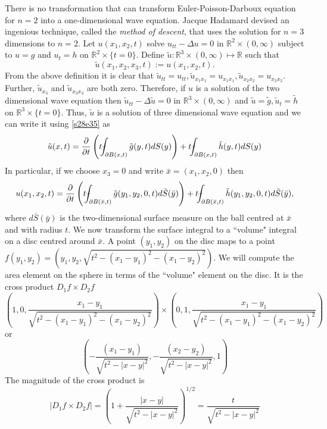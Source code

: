 \documentclass{article}
\newcommand{\fint}{\mbox{--}\mkern-16mu\int}
\theoremstyle{plain}
\numberwithin{thm}{section}
\theoremstyle{plain}
\numberwithin{prop}{section}
\theoremstyle{definition}
\numberwithin{defn}{section}
\theoremstyle{remark}
\numberwithin{equation}{section}
\begin{document}
There is no transformation that can transform Euler-Poisson-Darboux equation for $n=2$ into a one-dimensional wave 
equation. Jacque Hadamard devised an ingenious technique, called the \emph{method of descent}, that uses the 
solution for $n=3$ dimensions to $n=2$. Let $u(x_1, x_2, t)$ solve $u_{tt} - \Delta u = 0$ in $\mathbb{R}^2 \times 
(0, \infty)$ subject to $u = g$ and $u_t = h$ on $\mathbb{R}^2 \times \{t=0\}$. Define $\tilde{u}: \mathbb{R}^3 
\times (0, \infty) \mapsto \mathbb{R}$ such that
\begin{equation}\label{s28e38}
\tilde{u}(x_1, x_2, x_3, t) := u(x_1, x_2, t).
\end{equation}
From the above definition it is clear that $\tilde{u}_{tt} = u_{tt}, \tilde{u}_{x_1x_1} = u_{x_1x_1}, 
\tilde{u}_{x_2x_2} = u_{x_2x_2}$. Further, $\tilde{u}_{x_3}$ and $\tilde{u}_{x_3x_3}$ are both zero. Therefore, if 
$u$ is a solution of the two dimensional wave equation then $\tilde{u}_{tt} - \Delta\tilde{u} = 0$ in $\mathbb{R}^3 
\times (0, \infty)$ and $\tilde{u} = \tilde{g}, \tilde{u}_t = \tilde{h}$ on $\mathbb{R}^3 \times \{t = 0\}$. Thus, 
$\tilde{u}$ is a solution of three dimensional wave equation and we can write it using \eqref{s28e35} as
\[
\tilde{u}(x,t) = \frac{\partial}{\partial t}\left(t\fint_{\partial B(x,t)}\tilde{g}(y, t)dS(y)\right) + 
t\fint_{\partial B(x,t)}\tilde{h}(y, t)dS(y)
\]
In particular, if we choose $x_3=0$ and write $\bar{x} = (x_1, x_2, 0)$ then
\begin{equation}
u(x_1, x_2, t) = \frac{\partial}{\partial t}\left(t\fint_{\partial B(\bar{x},t)}\tilde{g}(y_1, y_2, 0, t)
d\bar{S}(\bar{y})\right) + t\fint_{\partial B(\bar{x},t)}\tilde{h}(y_1,y_2,0, t)d\bar{S}(\bar{y}),
\end{equation}
where $d\bar{S}(\bar{y})$ is the two-dimensional surface measure on the ball centred at $\bar{x}$ and with radius 
$t$. We now transform the surface integral to a ``volume" integral on a disc centred around $\bar{x}$. A point 
$(y_1, y_2)$ on the disc maps to a point $f(y_1, y_2) = (y_1, y_2, \sqrt{t^2 - (x_1 - y_1)^2 - (x_1 - y_2)^2})$. We 
will compute the area element on the sphere in terms of the ``volume" element on the disc. It is the cross product 
$D_1f \times D_2f$
\[
\left(1, 0, \frac{x_1 - y_1}{\sqrt{t^2 - (x_1 - y_1)^2 - (x_1 - y_2)^2}}\right) \times 
\left(0, 1, \frac{x_1 - y_1}{\sqrt{t^2 - (x_1 - y_1)^2 - (x_1 - y_2)^2}}\right)
\]
or
\[
\left(-\frac{(x_1 - y_1)}{\sqrt{t^2 - |x - y|^2}}, -\frac{(x_2 - y_2)}{\sqrt{t^2 - |x - y|^2}}, 1\right)
\]
The magnitude of the cross product is
\[
|D_1f \times D_2f| = \left(1 + \frac{|x - y|}{\sqrt{t^2 - |x - y|^2}}\right)^{1/2} = \frac{t}{\sqrt{t^2 - 
|x - y|^2}}
\]
\end{document}
